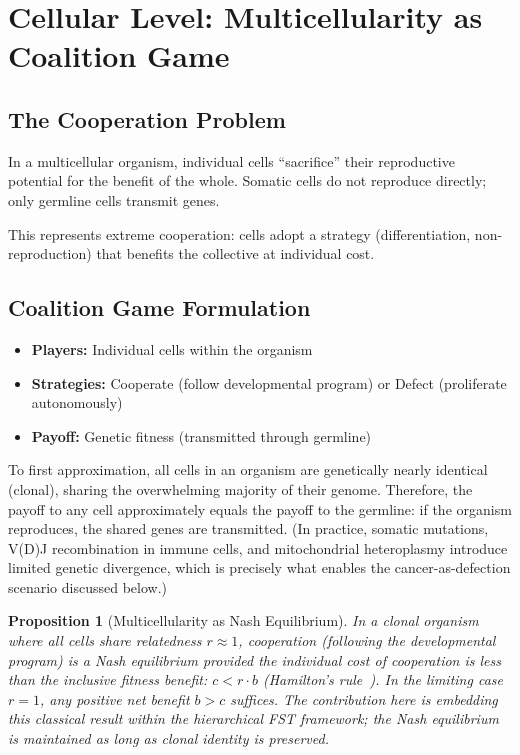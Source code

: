 \documentclass[12pt,a4paper]{article}
\newtheorem{proposition}{Proposition}
\theoremstyle{remark}
\begin{document}
\section{Cellular Level: Multicellularity as Coalition Game}
\label{sec:multicellularity}

\subsection{The Cooperation Problem}

In a multicellular organism, individual cells ``sacrifice'' their reproductive potential for the benefit of the whole. Somatic cells do not reproduce directly; only germline cells transmit genes.

This represents extreme cooperation: cells adopt a strategy (differentiation, non-reproduction) that benefits the collective at individual cost.

\subsection{Coalition Game Formulation}

\begin{itemize}
    \item \textbf{Players:} Individual cells within the organism
    \item \textbf{Strategies:} Cooperate (follow developmental program) or Defect (proliferate autonomously)
    \item \textbf{Payoff:} Genetic fitness (transmitted through germline)
\end{itemize}

To first approximation, all cells in an organism are genetically nearly identical (clonal), sharing the overwhelming majority of their genome. Therefore, the payoff to any cell approximately equals the payoff to the germline: if the organism reproduces, the shared genes are transmitted. (In practice, somatic mutations, V(D)J recombination in immune cells, and mitochondrial heteroplasmy introduce limited genetic divergence, which is precisely what enables the cancer-as-defection scenario discussed below.)

\begin{proposition}[Multicellularity as Nash Equilibrium]
\label{prop:multicellularity}
In a clonal organism where all cells share relatedness $r \approx 1$, cooperation (following the developmental program) is a Nash equilibrium provided the individual cost of cooperation is less than the inclusive fitness benefit: $c < r \cdot b$ (Hamilton's rule~\citep{Hamilton1964}). In the limiting case $r = 1$, any positive net benefit $b > c$ suffices. The contribution here is embedding this classical result within the hierarchical FST framework; the Nash equilibrium is maintained as long as clonal identity is preserved.
\end{proposition}
\end{document}
